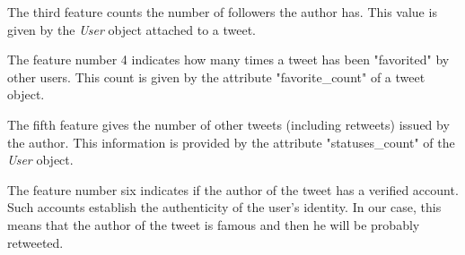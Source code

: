 The third feature counts the number of followers the author has. This value 
is given by the \emph{User} object attached to a tweet.

The feature number 4 indicates how many times a tweet has been "favorited" by 
other users. This count is given by the attribute "favorite\_count"  of a tweet 
object.

The fifth feature gives the number of other tweets (including retweets) issued 
by the author. This information is provided by the attribute "statuses\_count" 
of the \emph{User} object.

The feature number six indicates if the author of the tweet has a verified 
account. Such accounts establish the authenticity of the user's identity. In 
our case, this means that the author of the tweet is famous and then he will be 
probably retweeted.
